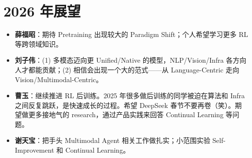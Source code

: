 \section{2026 年展望}

\begin{itemize}
  \item \textbf{薛福昭}：期待 Pretraining 出现较大的 Paradigm Shift；个人希望学习更多 RL 等跨领域知识。
  \item \textbf{刘子伟}：(1) 多模态迈向更 Unified/Native 的模型，NLP/Vision/Infra 各方向人才都能贡献；(2) 相信会出现一个大的范式——从 Language-Centric 走向 Vision/Multimodal-Centric。
  \item \textbf{曹玉}：继续推进 RL 后训练。2025 年很多做后训练的同学被迫在算法和 Infra 之间反复跳跃，是快速成长的过程。希望 DeepSeek 春节不要再卷（笑）。期望做更多接地气的 research，通过产品实践来回答 Continual Learning 等问题。
  \item \textbf{谢天宝}：把手头 Multimodal Agent 相关工作做扎实；小范围实验 Self-Improvement 和 Continual Learning。
\end{itemize}


